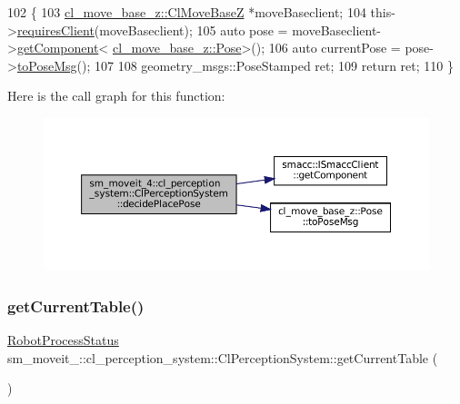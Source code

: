 \begin{DoxyCode}
102             \{
103                 \hyperlink{classcl__move__base__z_1_1ClMoveBaseZ}{cl\_move\_base\_z::ClMoveBaseZ} *moveBaseclient;
104                 this->\hyperlink{classsmacc_1_1ISmaccClient_a7a9990a2f3e35d547671188d69fee520}{requiresClient}(moveBaseclient);
105                 \textcolor{keyword}{auto} pose = moveBaseclient->\hyperlink{classsmacc_1_1ISmaccClient_adef78db601749ca63c19e74a27cb88cc}{getComponent}<
      \hyperlink{classcl__move__base__z_1_1Pose}{cl\_move\_base\_z::Pose}>();
106                 \textcolor{keyword}{auto} currentPose = pose->\hyperlink{classcl__move__base__z_1_1Pose_a9faf8c6b437ff6b19c8bddd692908dca}{toPoseMsg}();
107 
108                 geometry\_msgs::PoseStamped ret;
109                 \textcolor{keywordflow}{return} ret;
110             \}
\end{DoxyCode}
Here is the call graph for this function\+:
\nopagebreak
\begin{figure}[H]
\begin{center}
\leavevmode
\includegraphics[width=350pt]{classsm__moveit__4_1_1cl__perception__system_1_1ClPerceptionSystem_ab2431f4f2f48fc474e7b2f868bdec60d_cgraph}
\end{center}
\end{figure}
\mbox{\label{classsm__moveit__4_1_1cl__perception__system_1_1ClPerceptionSystem_aa08e0d656ca31a618c0a4c496afe36af}} 
\subsubsection{\texorpdfstring{get\+Current\+Table()}{getCurrentTable()}}
{\footnotesize\ttfamily \hyperlink{namespacesm__moveit__4_1_1cl__perception__system_a11dfa58fc66f2d368b894a9f1fec870e}{Robot\+Process\+Status} sm\+\_\+moveit\+\_\+::cl\+\_\+perception\+\_\+system\+::\+Cl\+Perception\+System\+::get\+Current\+Table (\begin{DoxyParamCaption}{ }\end{DoxyParamCaption})\hspace{0.3cm}{\ttfamily [inline]}}



